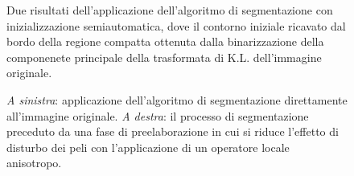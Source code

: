 \begin{figure}[tbp]
 \centerline{
   \hfill
  }
   \caption[Risultato della segmentazione con inizializzazione semiautomatica]
    {Due risultati dell'applicazione dell'algoritmo di segmentazione con inizializzazione
     semiautomatica, dove il contorno iniziale \e ricavato dal bordo della regione compatta
     ottenuta dalla binarizzazione della componenete principale della trasformata di K.L.
     dell'immagine originale.}
\end{figure}

\begin{figure}[tbp]
 \centerline{
   \hfill
  }
   \caption[Risultato della segmentazione con l'applicazione di un operatore anisotropo per la
    riduzione dei disturbi]
    {{\sl A sinistra}: applicazione dell'algoritmo di segmentazione direttamente all'immagine
     originale. {\sl A destra}: il processo di segmentazione \e preceduto da una fase di 
     preelaborazione in cui si riduce l'effetto di disturbo dei peli con l'applicazione
     di un operatore locale anisotropo.}
\end{figure}

 

